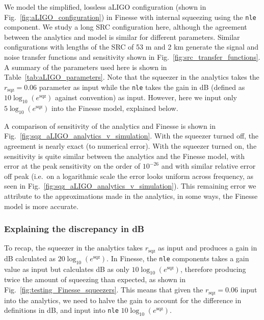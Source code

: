 \documentclass[aps,pra,superscriptaddress,reprint,nofootinbib]{revtex4-1}
\newcommand{\code}[1]{\texttt{#1}}
\begin{document}
We model the simplified, lossless aLIGO configuration (shown in Fig.~\ref{fig:aLIGO_configuration}) in Finesse with internal squeezing using the \code{nle} component. We study a long SRC configuration here, although the agreement between the analytics and model is similar for different parameters. Similar configurations with lengths of the SRC of 53 m and 2 km generate the signal and noise transfer functions and sensitivity shown in Fig.~\ref{fig:src_transfer_functions}. A summary of the parameters used here is shown in Table~\ref{tab:aLIGO_parameters}. Note that the squeezer in the analytics takes the $r_\mathrm{sqz} = 0.06$ parameter as input while the \code{nle} takes the gain in dB (defined as $10 \log_{10}(e^\mathrm{sqz})$ against convention) as input. However, here we input only $5 \log_{10}(e^\mathrm{sqz})$ into the Finesse model, explained below.


A comparison of sensitivity of the analytics and Finesse is shown in Fig.~\ref{fig:sqz_aLIGO_analytics_v_simulation}. With the squeezer turned off, the agreement is nearly exact (to numerical error). With the squeezer turned on, the sensitivity is quite similar between the analytics and the Finesse model, with error at the peak sensitivity on the order of $10^{-26}$ and with similar relative error off peak (i.e.\ on a logarithmic scale the error looks uniform across frequency, as seen in Fig.~\ref{fig:sqz_aLIGO_analytics_v_simulation}). This remaining error we attribute to the approximations made in the analytics, in some ways, the Finesse model is more accurate.


\subsubsection{Explaining the discrepancy in dB}

To recap, the squeezer in the analytics takes $r_\mathrm{sqz}$ as input and produces a gain in dB calculated as $20 \log_{10}(e^\mathrm{sqz})$. In Finesse, the \code{nle} components takes a gain value as input but calculates dB as only $10 \log_{10}(e^\mathrm{sqz})$, therefore producing twice the amount of squeezing than expected, as shown in Fig.~\ref{fig:testing_Finesse_squeezers}. This means that given the $r_\mathrm{sqz} = 0.06$ input into the analytics, we need to halve the gain to account for the difference in definitions in dB, and input into \code{nle} $10 \log_{10}(e^\mathrm{sqz})$.
\end{document}
